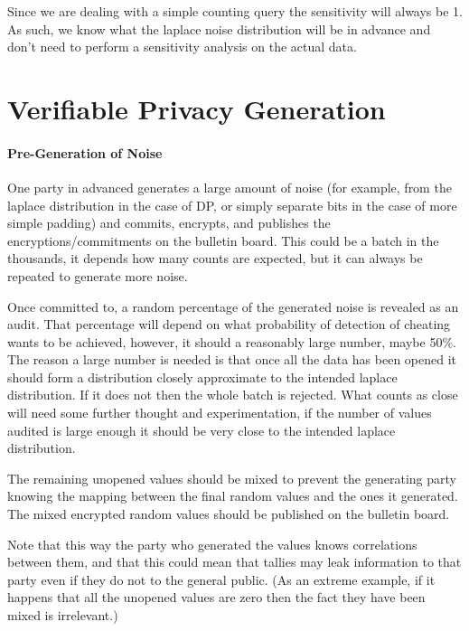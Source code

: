\documentclass[10pt,a4paper]{article}
\begin{document}
Since we are dealing with a simple counting query the sensitivity will always be 1. As such, we know what the laplace noise distribution will be in advance and don't need to perform a sensitivity analysis on the actual data.


\section{Verifiable Privacy Generation}

\paragraph{Pre-Generation of Noise}

One party in advanced generates a large amount of noise (for example, from the laplace distribution in the case of DP, or simply separate bits in the case of more simple padding) and commits, encrypts, and publishes the encryptions/commitments on the bulletin board. This could be a batch in the thousands, it depends how many counts are expected, but it can always be repeated to generate more noise.

Once committed to, a random percentage of the generated noise is revealed as an audit. That percentage will depend on what probability of detection of cheating wants to be achieved, however, it should a reasonably large number, maybe 50\%. The reason a large number is needed is that once all the data has been opened it should form a distribution closely approximate to the intended laplace distribution. If it does not then the whole batch is rejected. What counts as close will need some further thought and experimentation, if the number of values audited is large enough it should be very close to the intended laplace distribution.

The remaining unopened values should be mixed to prevent the generating party knowing the mapping between the final random values and the ones it generated. The mixed encrypted random values should be published on the bulletin board.

Note that this way the party who generated the values knows correlations between them, and that this could mean that tallies may leak information to that party even if they do not to the general public. (As an extreme example, if it happens that all the unopened values are zero then the fact they have been mixed is irrelevant.)
\end{document}
